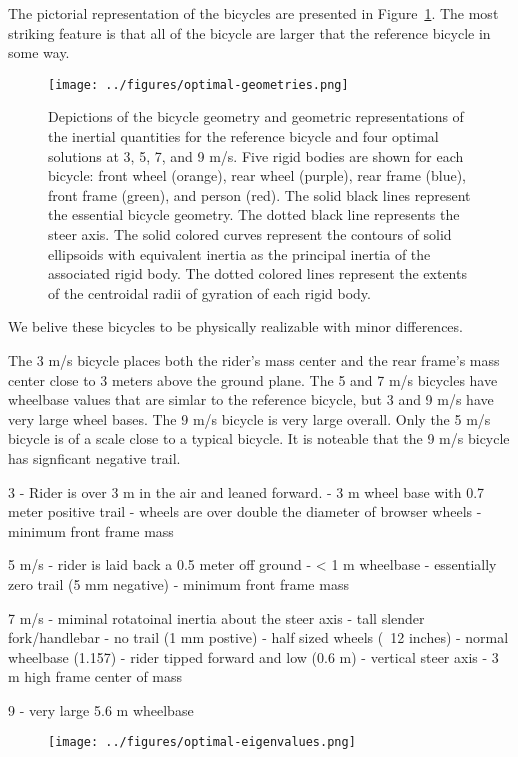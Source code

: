 \documentclass{bmd2019a}
\begin{document}
The pictorial representation of the bicycles are presented in
Figure~\ref{fig:optimal-geometries}. The most striking feature is that all of
the bicycle are larger that the reference bicycle in some way.
%
\begin{figure}
  \centering
  \texttt{[image: ../figures/optimal-geometries.png]}
  \label{fig:optimal-geometries}
  \caption{Depictions of the bicycle geometry and geometric representations of
    the inertial quantities for the reference bicycle and four optimal solutions
    at 3, 5, 7, and 9 m/s. Five rigid bodies are shown for each bicycle: front
    wheel (orange), rear wheel (purple), rear frame (blue), front frame
    (green), and person (red). The solid black lines represent the essential
    bicycle geometry. The dotted black line represents the steer axis. The
    solid colored curves represent the contours of solid ellipsoids with
    equivalent inertia as the principal inertia of the associated rigid body.
    The dotted colored lines represent the extents of the centroidal radii of
    gyration of each rigid body.}
\end{figure}

We
belive these bicycles to be physically realizable with minor differences.

  The 3 m/s bicycle places both the rider's mass center and
the rear frame's mass center close to 3 meters above the ground plane. The 5
and 7 m/s bicycles have wheelbase values that are simlar to the reference
bicycle, but 3 and 9 m/s have very large wheel bases. The 9 m/s bicycle is very
large overall. Only the 5 m/s bicycle is of a scale close to a typical bicycle.
It is noteable that the 9 m/s bicycle has signficant negative trail.

3
- Rider is over 3 m in the air and leaned forward.
- 3 m wheel base with 0.7 meter positive trail
- wheels are over double the diameter of browser wheels
- minimum front frame mass

5 m/s
- rider is laid back a 0.5 meter off ground
- < 1 m wheelbase
- essentially zero trail (5 mm negative)
- minimum front frame mass

7 m/s
- miminal rotatoinal inertia about the steer axis
- tall slender fork/handlebar
- no trail (1 mm postive)
- half sized wheels (~12 inches)
- normal wheelbase (1.157)
- rider tipped forward and low (0.6 m)
- vertical steer axis
- 3 m high frame center of mass

9
- very large 5.6 m wheelbase
%
\begin{figure}
  \centering
  \texttt{[image: ../figures/optimal-eigenvalues.png]}
  \label{fig:optimal-eigenvalues}
  \caption{}
\end{figure}
\end{document}
